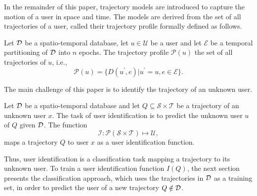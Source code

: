 In the remainder of this paper, trajectory models are introduced to capture the motion of a user in space and time. The models are derived from the set of all trajectories of a user, called their trajectory profile formally defined as follows.
\begin{definition}
Let $\mathcal{D}$ be a spatio-temporal database, let $u\in\mathcal{U}$ be a user and let $\mathcal{E}$ be a temporal partitioning of $\mathcal{D}$ into $n$ epochs.
The trajectory profile $\mathcal{P}(u)$ the set of all trajectories of $u$, i.e.,
$$
\mathcal{P}(u)=\{D(u^\prime,e)|u^\prime=u,e\in\mathcal{E}\}.
$$
\end{definition}
The main challenge of this paper is to identify the trajectory of an unknown user.
\begin{definition}
Let $\mathcal{D}$ be a spatio-temporal database and let $Q\subseteq \mathcal{S}\times\mathcal{T}$ be a trajectory of an unknown user $x$. The task of user identification is to predict the unknown user $u$ of $Q$ given $\mathcal{D}$. The function
$$
\mathcal{I}:\mathcal{P}(\mathcal{S}\times\mathcal{T})\mapsto \mathcal{U},
$$
maps a trajectory $Q$ to user $x$ as a user identification function.
\end{definition}
Thus, user identification is a classification task mapping a trajectory to its unknown user.
To train a user identification function $I(Q)$, the next section presents the classification approach, which uses the trajectories in $\mathcal{D}$ as a training set, in order to predict the user of a new trajectory $Q\notin\mathcal{D}$.
